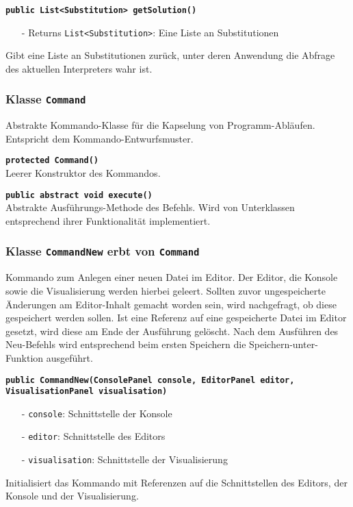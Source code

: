 \documentclass[parskip=full,11pt,twoside]{scrartcl}
\begin{document}
\textbf{\texttt{public List<Substitution> getSolution()}}
\begin{itemize}[noitemsep]
    \item[-] Returns \texttt{List<Substitution>}: Eine Liste an Substitutionen
\end{itemize}
Gibt eine Liste an Substitutionen zurück, unter deren Anwendung die Abfrage des aktuellen Interpreters wahr ist.

\subsubsection{Klasse \texttt{Command}}

Abstrakte Kommando-Klasse für die Kapselung von Programm-Abläufen. Entspricht dem Kommando-Entwurfsmuster.

\textbf{\texttt{protected Command()}}\\
Leerer Konstruktor des Kommandos.

\textbf{\texttt{public abstract void execute()}}\\
Abstrakte Ausführungs-Methode des Befehls. Wird von Unterklassen entsprechend ihrer Funktionalität implementiert.

\subsubsection{Klasse \texttt{CommandNew} erbt von \texttt{Command}}

Kommando zum Anlegen einer neuen Datei im Editor. Der Editor, die Konsole sowie die Visualisierung werden hierbei geleert. Sollten zuvor ungespeicherte Änderungen am Editor-Inhalt gemacht worden sein, wird nachgefragt, ob diese gespeichert werden sollen. Ist eine Referenz auf eine gespeicherte Datei im Editor gesetzt, wird diese am Ende der Ausführung gelöscht. Nach dem Ausführen des Neu-Befehls wird entsprechend beim ersten Speichern die Speichern-unter-Funktion ausgeführt.

\textbf{\texttt{public CommandNew(ConsolePanel console, EditorPanel editor,\\VisualisationPanel visualisation)}}
\begin{itemize}[noitemsep]
	\item[-] \texttt{console}: Schnittstelle der Konsole
	\item[-] \texttt{editor}: Schnittstelle des Editors
	\item[-] \texttt{visualisation}: Schnittstelle der Visualisierung
\end{itemize}
Initialisiert das Kommando mit Referenzen auf die Schnittstellen des Editors, der Konsole und der Visualisierung.
\end{document}
